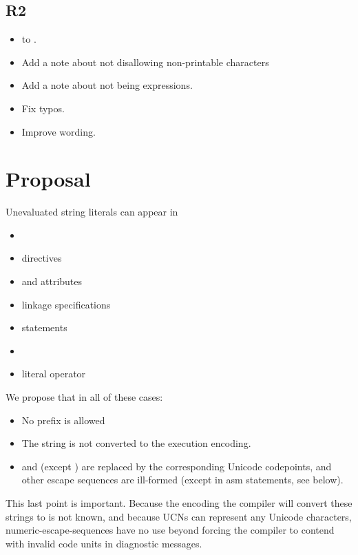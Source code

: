 \documentclass{wg21}
\begin{document}
\subsection{R2}
\begin{itemize}
    \item {} to .
    \item Add a note about not disallowing non-printable characters
    \item Add a note about  not being expressions.
    \item Fix typos.
    \item Improve wording.
\end{itemize}

\section{Proposal}

Unevaluated string literals can appear in

\begin{itemize}
\item {}
\item {} directives
\item \tcode{[[nodiscard]]} and \tcode{[[deprecated]]} attributes
\item {} linkage specifications
\item {} statements
\item {}
\item literal operator
\end{itemize}

We propose that in all of these cases:
\begin{itemize}
\item No prefix is allowed
\item The string is not converted to the execution encoding.
\item {} and  (except  ) are replaced by
the corresponding Unicode codepoints, and other escape sequences are ill-formed (except in asm statements, see below).
\end{itemize}

This last point is important. Because the encoding the compiler will convert these strings to is not known, and because UCNs can represent any Unicode characters,
numeric-escape-sequences have no use beyond forcing the compiler to contend with invalid
code units in diagnostic messages.
\end{document}
